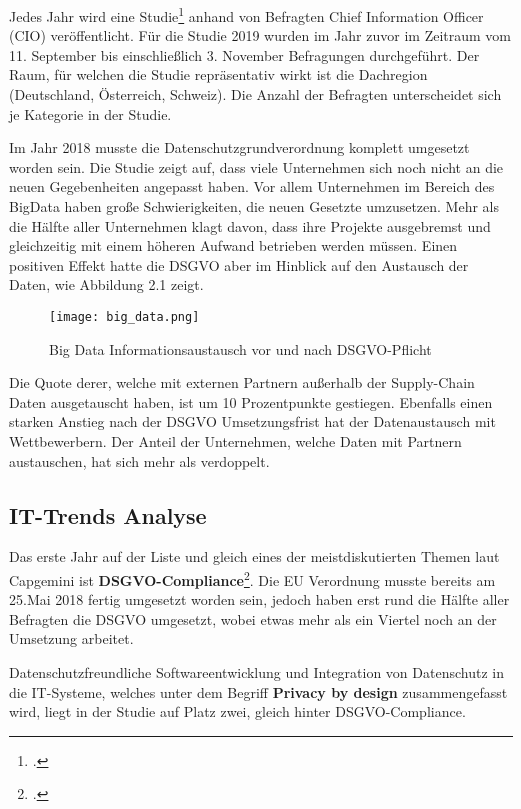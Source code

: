 Jedes Jahr wird eine Studie\footcite{Capgemini-Studie} anhand von Befragten Chief Information Officer (CIO) veröffentlicht.
Für die Studie 2019 wurden im Jahr zuvor im Zeitraum vom 11. September bis einschließlich 3. November Befragungen durchgeführt.
Der Raum, für welchen die Studie repräsentativ wirkt ist die Dachregion (Deutschland, Österreich, Schweiz).
Die Anzahl der Befragten unterscheidet sich je Kategorie in der Studie.

Im Jahr 2018 musste die Datenschutzgrundverordnung komplett umgesetzt worden sein. Die Studie zeigt auf, dass viele Unternehmen sich noch nicht an die neuen Gegebenheiten angepasst haben.
Vor allem Unternehmen im Bereich des BigData haben große Schwierigkeiten, die neuen Gesetzte umzusetzen. Mehr als die Hälfte aller Unternehmen klagt davon, dass ihre Projekte ausgebremst und gleichzeitig mit einem höheren Aufwand betrieben werden müssen.
Einen positiven Effekt hatte die DSGVO aber im Hinblick auf den Austausch der Daten, wie Abbildung 2.1 zeigt.
\begin{center}
\begin{figure}[h]
    \centering
    \texttt{[image: big\_data.png]}
    \caption{Big Data Informationsaustausch vor und nach DSGVO-Pflicht}
\end{figure}
\end{center}
Die Quote derer, welche mit externen Partnern außerhalb der Supply-Chain Daten ausgetauscht haben, ist um 10 Prozentpunkte gestiegen.
Ebenfalls einen starken Anstieg nach der DSGVO Umsetzungsfrist hat der Datenaustausch mit Wettbewerbern.
Der Anteil der Unternehmen, welche Daten mit Partnern austauschen, hat sich mehr als verdoppelt.
\subsection{IT-Trends Analyse}
Das erste Jahr auf der Liste und gleich eines der meistdiskutierten Themen laut Capgemini ist \textbf{DSGVO-Compliance}\footcite{Capgemini-Studie}.
Die EU Verordnung musste bereits am 25.Mai 2018 fertig umgesetzt worden sein, jedoch haben erst rund die Hälfte aller Befragten die DSGVO umgesetzt, wobei etwas mehr als ein Viertel noch an der Umsetzung arbeitet.

Datenschutzfreundliche Softwareentwicklung und Integration von Datenschutz in die IT-Systeme, welches unter dem Begriff \textbf{Privacy by design} zusammengefasst wird, liegt in der Studie auf Platz zwei, gleich hinter DSGVO-Compliance. 


